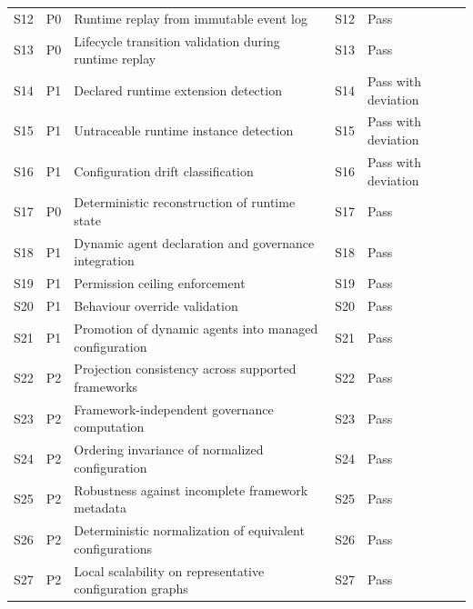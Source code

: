 \documentclass[10pt]{article}
\begin{document}
\begin{longtable}{p{0.9cm}p{2cm}p{6.2cm}p{2.3cm}p{1.6cm}}
S12 &
P0 &
Runtime replay from immutable event log &
S12 &
Pass \\

S13 &
P0 &
Lifecycle transition validation during runtime replay &
S13 &
Pass \\

S14 &
P1 &
Declared runtime extension detection &
S14 &
Pass with deviation \\

S15 &
P1 &
Untraceable runtime instance detection &
S15 &
Pass with deviation \\

S16 &
P1 &
Configuration drift classification &
S16 &
Pass with deviation \\

S17 &
P0 &
Deterministic reconstruction of runtime state &
S17 &
Pass \\

S18 &
P1 &
Dynamic agent declaration and governance integration &
S18 &
Pass \\

S19 &
P1 &
Permission ceiling enforcement &
S19 &
Pass \\

S20 &
P1 &
Behaviour override validation &
S20 &
Pass \\

S21 &
P1 &
Promotion of dynamic agents into managed configuration &
S21 &
Pass \\

S22 &
P2 &
Projection consistency across supported frameworks &
S22 &
Pass \\

S23 &
P2 &
Framework-independent governance computation &
S23 &
Pass \\

S24 &
P2 &
Ordering invariance of normalized configuration &
S24 &
Pass \\

S25 &
P2 &
Robustness against incomplete framework metadata &
S25 &
Pass \\

S26 &
P2 &
Deterministic normalization of equivalent configurations &
S26 &
Pass \\

S27 &
P2 &
Local scalability on representative configuration graphs &
S27 &
Pass \\

\bottomrule
\end{longtable}
\end{document}
